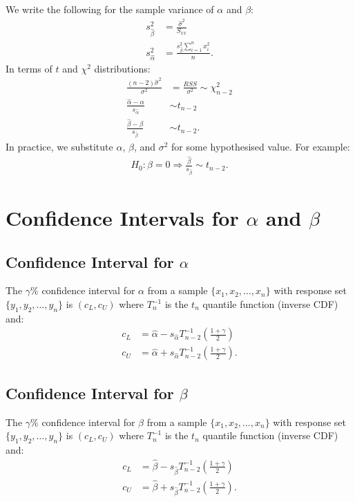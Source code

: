 \documentclass[a4paper, 12pt, twoside]{article}
\begin{document}
We write the following for the sample variance of $\alpha$ and $\beta$:
\begin{align*}
    s_{\hat\beta}^2  & = \frac{\hat\sigma^2}{S_{xx}}                   \\
    s_{\hat\alpha}^2 & = \frac{s_{\hat\beta}^2 \sum_{i=1}^n x_i^2}{n}.
\end{align*}
In terms of $t$ and $\chi^2$ distributions:
\begin{align*}
    \frac{(n - 2)\hat\sigma^2}{\sigma^2}       & = \frac{RSS}{\sigma^2}
    \sim \chi^2_{n - 2}                                                 \\
    \frac{\hat\alpha - \alpha}{s_{\hat\alpha}} & \sim t_{n - 2}         \\
    \frac{\hat\beta - \beta}{s_{\hat\beta}}    & \sim t_{n - 2}.
\end{align*}
In practice, we substitute $\alpha$, $\beta$, and $\sigma^2$ for
some hypothesised value. For example:
\begin{align*}
    H_0 : \beta = 0 \Rightarrow
    \frac{\hat\beta}{s_{\hat\beta}} \sim t_{n - 2}.
\end{align*}

\section{Confidence Intervals for $\alpha$ and $\beta$}

\subsection{Confidence Interval for $\alpha$}

The $\gamma\%$ confidence interval for $\alpha$ from a sample
$\{x_1, x_2, \ldots, x_n\}$ with response set
$\{y_1, y_2, \ldots, y_n\}$ is $(c_L, c_U)$ where $T^{-1}_n$ is the
$t_n$ quantile function (inverse CDF) and:
\begin{align*}
    c_L & = \hat\alpha - s_{\hat\alpha}
    T^{-1}_{n - 2}\left(\frac{1 + \gamma}{2}\right) \\
    c_U & = \hat\alpha + s_{\hat\alpha}
    T^{-1}_{n - 2}\left(\frac{1 + \gamma}{2}\right).
\end{align*}

\subsection{Confidence Interval for $\beta$}

The $\gamma\%$ confidence interval for $\beta$ from a sample
$\{x_1, x_2, \ldots, x_n\}$ with response set
$\{y_1, y_2, \ldots, y_n\}$ is $(c_L, c_U)$ where $T^{-1}_n$ is the
$t_n$ quantile function (inverse CDF) and:
\begin{align*}
    c_L & = \hat\beta - s_{\hat\beta}
    T^{-1}_{n - 2}\left(\frac{1 + \gamma}{2}\right) \\
    c_U & = \hat\beta + s_{\hat\beta}
    T^{-1}_{n - 2}\left(\frac{1 + \gamma}{2}\right).
\end{align*}
\end{document}
